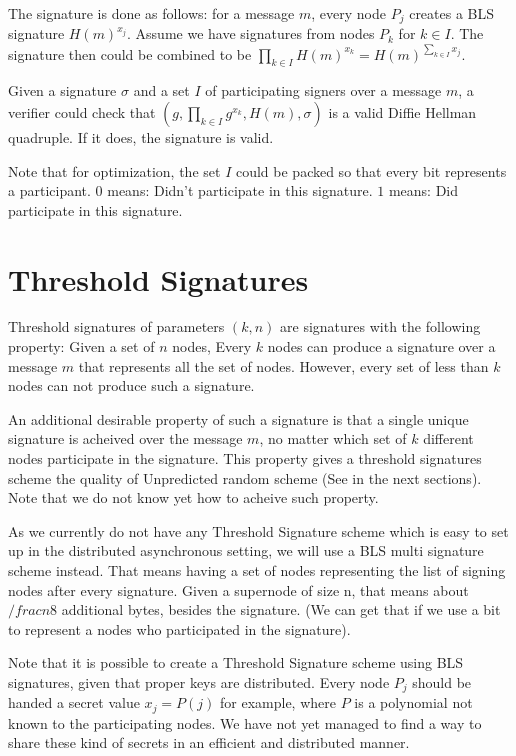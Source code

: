 The signature is done as follows: for a message $m$, every node $P_j$ creates a
BLS signature ${H(m)}^{x_j}$. Assume we have signatures from nodes $P_k$ for $k
\in I$. The signature then could be combined to be ${\prod}_{k \in
I}{{H(m)}^{x_k}} = {H(m)}^{\sum_{k \in I}{x_j}}$.

Given a signature $\sigma$ and a set $I$ of participating signers over a message
$m$, a verifier could check that $(g,{\prod}_{k \in I}{g^{x_k}},H(m),\sigma)$ is
a valid Diffie Hellman quadruple. If it does, the signature is valid.

Note that for optimization, the set $I$ could be packed so that every bit
represents a participant. $0$ means: Didn't participate in this signature. $1$
means: Did participate in this signature.

\section{Threshold Signatures}

Threshold signatures of parameters $(k,n)$ are signatures with the following
property: Given a set of $n$ nodes, Every $k$ nodes can produce a signature over
a message $m$ that represents all the set of nodes. However, every set of less
than $k$ nodes can not produce such a signature. 

An additional desirable property of such a signature is that a single unique
signature is acheived over the message $m$, no matter which set of $k$ different
nodes participate in the signature. This property gives a threshold signatures
scheme the quality of Unpredicted random scheme (See in the next sections). Note
that we do not know yet how to acheive such property.

As we currently do not have any Threshold Signature scheme which is easy to set
up in the distributed asynchronous setting, we will use a BLS multi signature
scheme instead. That means having a set of nodes representing the list of
signing nodes after every signature. Given a supernode of size n, that means
about $/frac{n}{8}$ additional bytes, besides the signature. (We can get that if
we use a bit to represent a nodes who participated in the signature).

Note that it is possible to create a Threshold Signature scheme using BLS
signatures, given that proper keys are distributed. Every node $P_j$ should be
handed a secret value $x_j = P(j)$ for example, where $P$ is a polynomial not
known to the participating nodes. We have not yet managed to find a way to share
these kind of secrets in an efficient and distributed manner.

